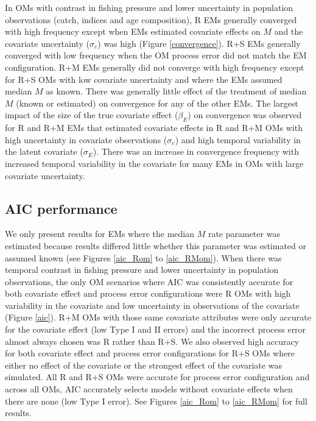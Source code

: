 \documentclass[
  12pt,
]{article}
\begin{document}
In OMs with contrast in fishing pressure and lower uncertainty in population observations (catch, indices and age composition), R EMs generally converged with high frequency except when EMs estimated covariate effects on \(M\) and the covariate uncertainty (\(\sigma_e\)) was high (Figure \ref{convergence}). R+S EMs generally converged with low frequency when the OM process error did not match the EM configuration. R+M EMs generally did not converge with high frequency except for R+S OMs with low covariate uncertainty and where the EMs assumed median \(M\) as known. There was generally little effect of the treatment of median \(M\) (known or estimated) on convergence for any of the other EMs. The largest impact of the size of the true covariate effect (\(\beta_E\)) on convergence was observed for R and R+M EMs that estimated covariate effects in R and R+M OMs with high uncertainty in covariate observations (\(\sigma_e\)) and high temporal variability in the latent covariate (\(\sigma_E\)). There was an increase in convergence frequency with increased temporal variability in the covariate for many EMs in OMs with large covariate uncertainty.

\hypertarget{aic-performance}{%
\subsection*{AIC performance}\label{aic-performance}}

We only present results for EMs where the median \(M\) rate parameter was estimated because results differed little whether this parameter was estimated or assumed known (see Figures \ref{aic_Rom} to \ref{aic_RMom}). When there was temporal contrast in fishing pressure and lower uncertainty in population observations, the only OM scenarios where AIC was consistently accurate for both covariate effect and process error configurations were R OMs with high variability in the covariate and low uncertainty in observations of the covariate (Figure \ref{aic}). R+M OMs with those same covariate attributes were only accurate for the covariate effect (low Type I and II errors) and the incorrect process error almost always chosen was R rather than R+S. We also observed high accuracy for both covariate effect and process error configurations for R+S OMs where either no effect of the covariate or the strongest effect of the covariate was simulated. All R and R+S OMs were accurate for process error configuration and across all OMs, AIC accurately selects models without covariate effects when there are none (low Type I error). See Figures \ref{aic_Rom} to \ref{aic_RMom} for full results.
\end{document}
